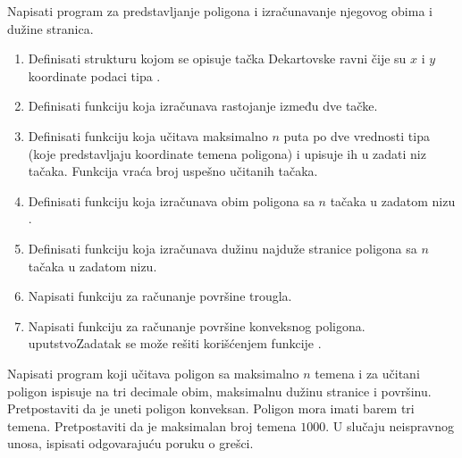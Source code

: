 \begin{Exercise}[label=struc.10] 
Napisati program za predstavljanje poligona i izračunavanje njegovog
obima i dužine stranica.
\begin{enumerate}
\item Definisati strukturu  kojom se opisuje
  tačka Dekartovske ravni čije su $x$ i $y$ koordinate podaci tipa
  .

\item Definisati funkciju 
  koja izračunava rastojanje između dve tačke.

\item Definisati funkciju  koja učitava maksimalno $n$ puta po dve
  vrednosti tipa  (koje predstavljaju koordinate temena
  poligona) i upisuje ih u zadati niz tačaka. Funkcija vraća broj
  uspešno učitanih tačaka.

\item Definisati funkciju  koja izračunava obim poligona sa $n$ tačaka u zadatom nizu
  .

\item Definisati funkciju  koja izračunava dužinu najduže stranice
  poligona sa $n$ tačaka u zadatom nizu.

\item Napisati funkciju  za računanje površine trougla.

\item Napisati funkciju  za računanje površine konveksnog
  poligona. uputstvo{Zadatak se može rešiti korišćenjem funkcije
    }.
\end{enumerate}
Napisati program koji učitava poligon sa maksimalno $n$ temena
  i za učitani poligon ispisuje na tri decimale
  obim, maksimalnu dužinu stranice i površinu. Pretpostaviti da je
  uneti poligon konveksan. Poligon mora imati barem tri temena.
  Pretpostaviti da je maksimalan broj temena $1000$.
  U slučaju neispravnog unosa, ispisati odgovarajuću poruku o grešci.


\end{Exercise}
